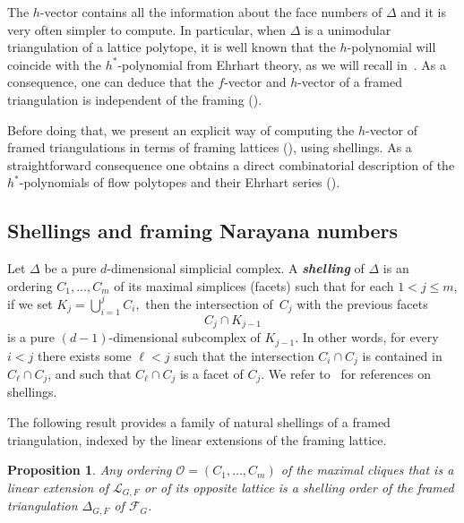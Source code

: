 \documentclass[12pt, reqno]{amsart}
\newcommand{\defn}[1]{{\color{blue!50!black}\textbf{\emph{#1}}}}
\theoremstyle{plain}
\newtheorem{proposition}[theorem]{Proposition}
\theoremstyle{definition}
\numberwithin{equation}{section}
\begin{document}
\medskip

The $h$-vector contains all the information about the face numbers of $\Delta$ and it is very often simpler to compute. In particular, when $\Delta$ is a unimodular triangulation of a lattice polytope, it is well known that the $h$-polynomial will coincide with the $h^*$-polynomial from Ehrhart theory, as we will recall in~. As a consequence, one can deduce that the $f$-vector and $h$-vector of a framed triangulation is independent of the framing ().


Before doing that, we present an explicit way of computing the $h$-vector of framed triangulations in terms of framing lattices (), using shellings. As a straightforward consequence one obtains a direct combinatorial description of the $h^*$-polynomials of flow polytopes and their Ehrhart series ().


\subsection{Shellings and framing Narayana numbers}


Let $\Delta$ be a pure $d$-dimensional simplicial complex. A \defn{shelling} of $\Delta$ is an ordering $C_1, \ldots, C_m$ of its maximal simplices (facets) such that for each $1< j \leq m$, if we set $ K_{j} = \bigcup_{i=1}^{j} C_i, $ then the intersection of~$C_j$ with the previous facets
\[
C_{j} \cap K_{j-1}
\]
is a pure $(d-1)$-dimensional subcomplex of $K_{j-1}$. In other words, for every $i<j$ there exists some $\ell<j$ such that the intersection $C_i\cap C_j$ is contained in $C_\ell \cap C_j$, and such that $C_\ell \cap C_j$ is a facet of $C_j$. We refer to~\cite{ziegler_lectures_1995} for references on shellings.

The following result provides a family of natural shellings of a framed triangulation, indexed by the linear extensions of the framing lattice.

\begin{proposition}\label{prop_shelling}
Any ordering $\mathscr{O}=(C_1,\ldots, C_m)$ of the maximal cliques that is a linear extension of $\mathscr{L}_{G,F}$ or of its opposite lattice is a shelling order of the framed triangulation $\Delta_{G,F}$ of $\mathcal{F}_G$.
\end{proposition}
\end{document}

